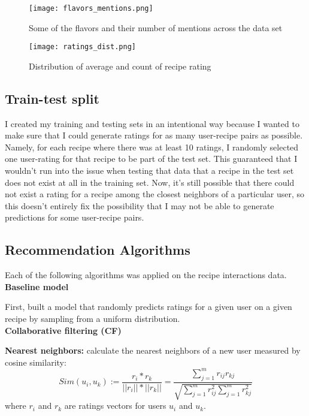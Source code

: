 \documentclass{article}
\begin{document}
\begin{figure}[H]
    \centering
    \texttt{[image: flavors\_mentions.png]}
    \caption{Some of the flavors and their number of mentions across the data set}
    \label{fig:flavors_mentions}
\end{figure}

\begin{figure}[H]
    \centering
    \texttt{[image: ratings\_dist.png]}
    \caption{Distribution of average and count of recipe rating}
    \label{fig:ratings_dist}
\end{figure}


\subsection{Train-test split}

I created my training and testing sets in an intentional way because I wanted to make sure that I could generate ratings for as many user-recipe pairs as possible. Namely, for each recipe where there was at least 10 ratings, I randomly selected one user-rating for that recipe to be part of the test set. This guaranteed that I wouldn't run into the issue when testing that data that a recipe in the test set does not exist at all in the training set. Now, it's still possible that there could not exist a rating for a recipe among the closest neighbors of a particular user, so this doesn't entirely fix the possibility that I may not be able to generate predictions for some user-recipe pairs. 


\subsection{Recommendation Algorithms}

Each of the following algorithms was applied on the recipe interactions data. 
\vspace{0.1in}
\\
\textbf{Baseline model}

First, built a model that randomly predicts ratings for a given user on a given recipe by sampling from a uniform distribution. 
\vspace{0.1in}
\\
\textbf{Collaborative filtering (CF)}
\vspace{0.1in}

\textbf{Nearest neighbors:} calculate the nearest neighbors of a new user measured by cosine similarity:
\begin{equation}
    Sim(u_i, u_k) := \frac{r_i * r_k}{||r_i||*||r_k||} = \frac{\sum_{j=1}^mr_{ij}r_{kj}}{\sqrt{\sum_{j=1}^mr_{ij}^2\sum_{j=1}^mr_{kj}^2}}
\end{equation} where $r_i$ and $r_k$ are ratings vectors for users $u_i$ and $u_k$. 
\end{document}

